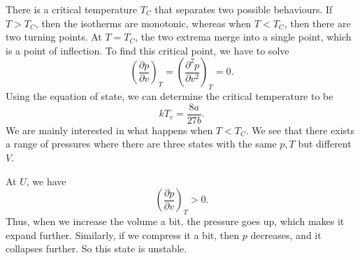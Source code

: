 \documentclass[a4paper]{article}
\def\isothermia{(1.6,0.3) (1.7,0.19847) (1.8,0.14429) (1.9,0.11496) (2.0,0.10000) (2.1,0.09349) (2.2,0.09194)}
\def\isothermib{(2.2,0.09194) (2.3,0.09328) (2.4,0.09623) (2.5,0.10000) (2.6,0.10411) (2.7,0.10825) (2.8,0.11224) (2.9,0.11600) (3.0,0.11944) (3.1,0.12257) (3.2,0.12536) (3.3,0.12782) (3.4,0.12997) (3.5,0.13184) (3.6,0.13343) (3.7,0.13477) (3.8,0.13588) (3.9,0.13679) (4.0,0.13750) (4.1,0.13804) (4.2,0.13843) (4.3,0.13867) (4.4,0.13879) (4.5,0.13880)}
\def\isothermic{(4.5,0.13880) (4.6,0.13871) (4.7,0.13852) (4.8,0.13825) (4.9,0.13791) (5.0,0.13750) (5.1,0.13703) (5.2,0.13652) (5.3,0.13595) (5.4,0.13535) (5.5,0.13471) (5.6,0.13404) (5.7,0.13334) (5.8,0.13262) (5.9,0.13187) (6.0,0.13111) (6.1,0.13033) (6.2,0.12954) (6.3,0.12874) (6.4,0.12793) (6.5,0.12711) (6.6,0.12629) (6.7,0.12546) (6.8,0.12463) (6.9,0.12379) (7.0,0.12296) (7.1,0.12212) (7.2,0.12129) (7.3,0.12046) (7.4,0.11963) (7.5,0.11880) (7.6,0.11798) (7.7,0.11716) (7.8,0.11635) (7.9,0.11554) (8.0,0.11473) (8.1,0.11393) (8.2,0.11314) (8.3,0.11235) (8.4,0.11157) (8.5,0.11080) (8.6,0.11003) (8.7,0.10927) (8.8,0.10851) (8.9,0.10776) (9.0,0.10702) (9.1,0.10629) (9.2,0.10556) (9.3,0.10484) (9.4,0.10413) (9.5,0.10342) (9.6,0.10272) (9.7,0.10203) (9.8,0.10135) (9.9,0.10067) (10.0,0.10000) (10.1,0.09934) (10.2,0.09868) (10.3,0.09803) (10.4,0.09739) (10.5,0.09675) (10.6,0.09613) (10.7,0.09550) (10.8,0.09489) (10.9,0.09428) (11.0,0.09368) (11.1,0.09308) (11.2,0.09249) (11.3,0.09191) (11.4,0.09133) (11.5,0.09076) (11.6,0.09020) (11.7,0.08964) (11.8,0.08909) (11.9,0.08854) (12.0,0.08801) (12.1,0.08747) (12.2,0.08694) (12.3,0.08642) (12.4,0.08590) (12.5,0.08539) (12.6,0.08489) (12.7,0.08438) (12.8,0.08389) (12.9,0.08340) (13.0,0.08291) (13.1,0.08243) (13.2,0.08196) (13.3,0.08149) (13.4,0.08103) (13.5,0.08057) (13.6,0.08011) (13.7,0.07966) (13.8,0.07921) (13.9,0.07877) (14.0,0.07834) (14.1,0.07790) (14.2,0.07748) (14.3,0.07705) (14.4,0.07663) (14.5,0.07622) (14.6,0.07581) (14.7,0.07540) (14.8,0.07500) (14.9,0.07460) (15.0,0.07421)}
\def\isothermi{\isothermia \isothermib \isothermic}
\def\isothermii{(1.8,0.3) (1.9,0.26107) (2.0,0.23150) (2.1,0.21303) (2.2,0.20153) (2.3,0.19444) (2.4,0.19016) (2.5,0.18767) (2.6,0.18629) (2.7,0.18560) (2.8,0.18530) (2.9,0.18521) (3.0,0.18519) (3.1,0.18518) (3.2,0.18513) (3.3,0.18499) (3.4,0.18477) (3.5,0.18444) (3.6,0.18401) (3.7,0.18347) (3.8,0.18285) (3.9,0.18213) (4.0,0.18133) (4.1,0.18046) (4.2,0.17952) (4.3,0.17852) (4.4,0.17747) (4.5,0.17637) (4.6,0.17523) (4.7,0.17406) (4.8,0.17285) (4.9,0.17163) (5.0,0.17038) (5.1,0.16911) (5.2,0.16783) (5.3,0.16654) (5.4,0.16524) (5.5,0.16393) (5.6,0.16263) (5.7,0.16132) (5.8,0.16001) (5.9,0.15871) (6.0,0.15741) (6.1,0.15612) (6.2,0.15483) (6.3,0.15355) (6.4,0.15228) (6.5,0.15102) (6.6,0.14977) (6.7,0.14853) (6.8,0.14730) (6.9,0.14608) (7.0,0.14488) (7.1,0.14368) (7.2,0.14250) (7.3,0.14133) (7.4,0.14018) (7.5,0.13903) (7.6,0.13790) (7.7,0.13679) (7.8,0.13568) (7.9,0.13459) (8.0,0.13352) (8.1,0.13245) (8.2,0.13140) (8.3,0.13037) (8.4,0.12934) (8.5,0.12833) (8.6,0.12733) (8.7,0.12634) (8.8,0.12537) (8.9,0.12441) (9.0,0.12346) (9.1,0.12252) (9.2,0.12160) (9.3,0.12068) (9.4,0.11978) (9.5,0.11889) (9.6,0.11801) (9.7,0.11715) (9.8,0.11629) (9.9,0.11545) (10.0,0.11461) (10.1,0.11379) (10.2,0.11297) (10.3,0.11217) (10.4,0.11138) (10.5,0.11060) (10.6,0.10982) (10.7,0.10906) (10.8,0.10831) (10.9,0.10756) (11.0,0.10683) (11.1,0.10610) (11.2,0.10539) (11.3,0.10468) (11.4,0.10398) (11.5,0.10329) (11.6,0.10261) (11.7,0.10193) (11.8,0.10127) (11.9,0.10061) (12.0,0.09996) (12.1,0.09932) (12.2,0.09868) (12.3,0.09806) (12.4,0.09744) (12.5,0.09683) (12.6,0.09622) (12.7,0.09562) (12.8,0.09503) (12.9,0.09445) (13.0,0.09387) (13.1,0.09330) (13.2,0.09274) (13.3,0.09218) (13.4,0.09163) (13.5,0.09109) (13.6,0.09055) (13.7,0.09001) (13.8,0.08949) (13.9,0.08897) (14.0,0.08845) (14.1,0.08794) (14.2,0.08744) (14.3,0.08694) (14.4,0.08645) (14.5,0.08596) (14.6,0.08548) (14.7,0.08500) (14.8,0.08453) (14.9,0.08406) (15.0,0.08360)}
\def\isothermiii{(2.2,0.3) (2.3,0.28559) (2.4,0.27480) (2.5,0.26667) (2.6,0.26036) (2.7,0.25531) (2.8,0.25113) (2.9,0.24757) (3.0,0.24444) (3.1,0.24161) (3.2,0.23899) (3.3,0.23652) (3.4,0.23414) (3.5,0.23184) (3.6,0.22958) (3.7,0.22736) (3.8,0.22517) (3.9,0.22299) (4.0,0.22083) (4.1,0.21869) (4.2,0.21655) (4.3,0.21443) (4.4,0.21232) (4.5,0.21023) (4.6,0.20815) (4.7,0.20609) (4.8,0.20404) (4.9,0.20201) (5.0,0.20000) (5.1,0.19801) (5.2,0.19604) (5.3,0.19409) (5.4,0.19217) (5.5,0.19027) (5.6,0.18839) (5.7,0.18653) (5.8,0.18470) (5.9,0.18289) (6.0,0.18111) (6.1,0.17935) (6.2,0.17762) (6.3,0.17591) (6.4,0.17423) (6.5,0.17257) (6.6,0.17093) (6.7,0.16932) (6.8,0.16773) (6.9,0.16617) (7.0,0.16463) (7.1,0.16311) (7.2,0.16161) (7.3,0.16014) (7.4,0.15869) (7.5,0.15726) (7.6,0.15586) (7.7,0.15447) (7.8,0.15311) (7.9,0.15177) (8.0,0.15045) (8.1,0.14914) (8.2,0.14786) (8.3,0.14660) (8.4,0.14535) (8.5,0.14413) (8.6,0.14292) (8.7,0.14173) (8.8,0.14056) (8.9,0.13941) (9.0,0.13827) (9.1,0.13715) (9.2,0.13605) (9.3,0.13496) (9.4,0.13389) (9.5,0.13283) (9.6,0.13179) (9.7,0.13077) (9.8,0.12976) (9.9,0.12876) (10.0,0.12778) (10.1,0.12681) (10.2,0.12585) (10.3,0.12491) (10.4,0.12398) (10.5,0.12307) (10.6,0.12217) (10.7,0.12128) (10.8,0.12040) (10.9,0.11953) (11.0,0.11868) (11.1,0.11783) (11.2,0.11700) (11.3,0.11618) (11.4,0.11537) (11.5,0.11457) (11.6,0.11379) (11.7,0.11301) (11.8,0.11224) (11.9,0.11148) (12.0,0.11073) (12.1,0.10999) (12.2,0.10926) (12.3,0.10854) (12.4,0.10783) (12.5,0.10713) (12.6,0.10644) (12.7,0.10575) (12.8,0.10508) (12.9,0.10441) (13.0,0.10375) (13.1,0.10310) (13.2,0.10245) (13.3,0.10182) (13.4,0.10119) (13.5,0.10057) (13.6,0.09995) (13.7,0.09934) (13.8,0.09875) (13.9,0.09815) (14.0,0.09757) (14.1,0.09699) (14.2,0.09642) (14.3,0.09585) (14.4,0.09529) (14.5,0.09474) (14.6,0.09419) (14.7,0.09365) (14.8,0.09312) (14.9,0.09259) (15.0,0.09206)}
\begin{document}
\begin{center}
\end{center}
There is a critical temperature $T_C$ that separates two possible behaviours. If $T > T_C$, then the isotherms are monotonic, whereas when $T < T_C$, then there are two turning points. At $T = T_C$, the two extrema merge into a single point, which is a point of inflection. To find this critical point, we have to solve
\[
  \left(\frac{\partial p}{\partial v}\right)_T = \left(\frac{\partial^2 p}{\partial v^2}\right)_T = 0.
\]
Using the equation of state, we can determine the critical temperature to be
\[
  kT_c = \frac{8a}{27 b}.
\]
We are mainly interested in what happens when $T < T_C$. We see that there exists a range of pressures where there are three states with the same $p, T$ but different $V$.
\begin{center}
\end{center}
At $U$, we have
\[
  \left(\frac{\partial p}{\partial v}\right)_T > 0.
\]
Thus, when we increase the volume a bit, the pressure goes up, which makes it expand further. Similarly, if we compress it a bit, then $p$ decreases, and it collapses further. So this state is unstable.
\end{document}

